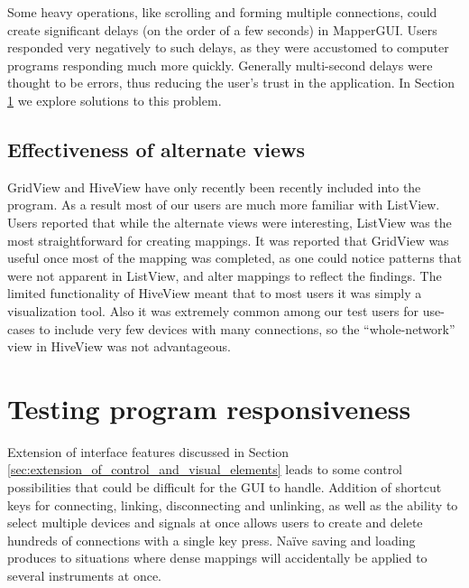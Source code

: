 Some heavy operations, like scrolling and forming multiple connections, could create significant delays (on the order of a few seconds) in MapperGUI. Users responded very negatively to such delays, as they were accustomed to computer programs responding much more quickly. Generally multi-second delays were thought to be errors, thus reducing the user's trust in the application. In Section \ref{sec:testing_program_responsiveness} we explore solutions to this problem.
	

	\subsection{Effectiveness of alternate views} %
	\label{sub:effectiveness_of_alternate_views}

GridView and HiveView have only recently been recently included into the program. As a result most of our users are much more familiar with ListView. Users reported that while the alternate views were interesting, ListView was the most straightforward for creating mappings. It was reported that GridView was useful once most of the mapping was completed, as one could notice patterns that were not apparent in ListView, and alter mappings to reflect the findings. The limited functionality of HiveView meant that to most users it was simply a visualization tool. Also it was extremely common among our test users for use-cases to include very few devices with many connections, so the ``whole-network'' view in HiveView was not advantageous.
	
	

\section{Testing program responsiveness} %
\label{sec:testing_program_responsiveness}

Extension of interface features discussed in Section \ref{sec:extension_of_control_and_visual_elements} leads to some control possibilities that could be difficult for the GUI to handle. Addition of shortcut keys for connecting, linking, disconnecting and unlinking, as well as the ability to select multiple devices and signals at once allows users to create and delete hundreds of connections with a single key press. Na\"{i}ve saving and loading produces to situations where dense mappings will accidentally be applied to several instruments at once.

